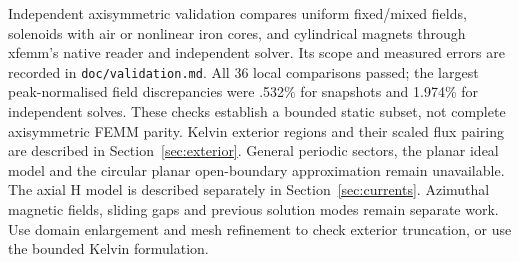 Independent axisymmetric validation compares uniform fixed/mixed fields, solenoids with air or nonlinear iron cores,
and cylindrical magnets through xfemm's native reader and independent solver. Its scope and measured errors are recorded in \nolinkurl{doc/validation.md}.
All 36 local comparisons passed; the largest peak-normalised field discrepancies
were .532\% for snapshots and 1.974\% for independent solves.
These checks establish a bounded static subset, not complete axisymmetric FEMM
parity. Kelvin exterior regions and their scaled flux pairing are described in
Section~\ref{sec:exterior}. General periodic sectors, the planar ideal model
and the circular planar open-boundary approximation remain unavailable.
The axial H model is described separately in Section~\ref{sec:currents}.
Azimuthal magnetic fields, sliding gaps and previous
solution modes remain separate work. Use domain enlargement and mesh refinement
to check exterior truncation, or use the bounded Kelvin formulation.
